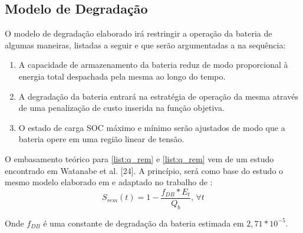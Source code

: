 \subsection{Modelo de Degradação}
O modelo de degradação elaborado irá restringir a operação da bateria de algumas maneiras, listadas a seguir e que serão argumentadas a na sequência:

 \begin{enumerate}
  \label{list:q_rem}
  \item A capacidade de armazenamento da bateria reduz de modo proporcional à energia total despachada pela mesma ao longo do tempo.
  \label{list:cp}
  \item A degradação da bateria entrará na estratégia de operação da mesma através de uma penalização de custo inserida na função objetiva.
   \label{list:SOC-range}
  \item O estado de carga \ac{SOC} máximo e mínimo serão ajustados de modo que a bateria opere em uma região linear de tensão.
\end{enumerate}

O embasamento teórico para \ref{list:q_rem} e \ref{list:q_rem} vem de um estudo encontrado em Watanabe et al. [24].
A princípio, será como base do estudo o mesmo modelo elaborado em \cite{Peterson2010} 
e adaptado no trabalho de \cite{Wankmller2017}:
\begin{equation}
    S_{rem}(t) = 1 - \frac{f_{DB}*E_{t}}{Q_{b}},\,\forall t 
\end{equation}

Onde $f_{DB}$ é uma constante de degradação da bateria estimada em $2,71*10^{-5}$.

